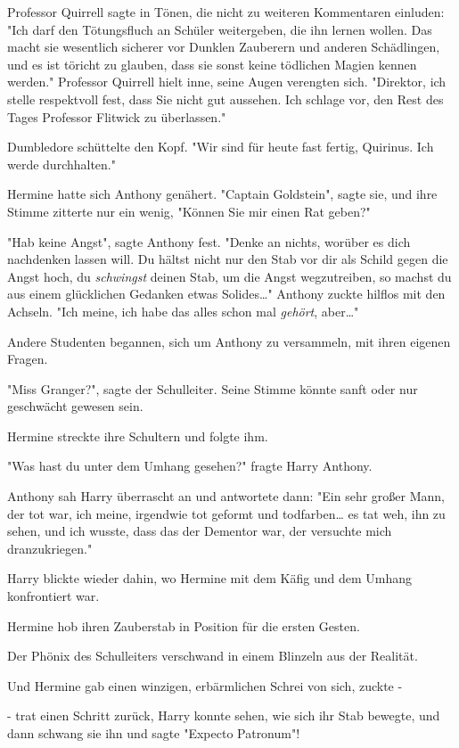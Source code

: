 {Professor Quirrell sagte in Tönen, die nicht zu weiteren Kommentaren einluden: "Ich darf den Tötungsfluch an Schüler weitergeben, die ihn lernen wollen. Das macht sie wesentlich sicherer vor Dunklen Zauberern und anderen Schädlingen, und es ist töricht zu glauben, dass sie sonst keine tödlichen Magien kennen werden." Professor Quirrell hielt inne, seine Augen verengten sich. "Direktor, ich stelle respektvoll fest, dass Sie nicht gut aussehen. Ich schlage vor, den Rest des Tages Professor Flitwick zu überlassen."

Dumbledore schüttelte den Kopf. "Wir sind für heute fast fertig, Quirinus. Ich werde durchhalten."

Hermine hatte sich Anthony genähert. "Captain Goldstein", sagte sie, und ihre Stimme zitterte nur ein wenig, "Können Sie mir einen Rat geben?"

"Hab keine Angst", sagte Anthony fest. "Denke an nichts, worüber es dich nachdenken lassen will. Du hältst nicht nur den Stab vor dir als Schild gegen die Angst hoch, du \emph{schwingst} deinen Stab, um die Angst wegzutreiben, so machst du aus einem glücklichen Gedanken etwas Solides…" Anthony zuckte hilflos mit den Achseln. "Ich meine, ich habe das alles schon mal \emph{gehört}, aber…"

Andere Studenten begannen, sich um Anthony zu versammeln, mit ihren eigenen Fragen.

"Miss Granger?", sagte der Schulleiter. Seine Stimme könnte sanft oder nur geschwächt gewesen sein.

Hermine streckte ihre Schultern und folgte ihm.

"Was hast du unter dem Umhang gesehen?" fragte Harry Anthony.

Anthony sah Harry überrascht an und antwortete dann: "Ein sehr großer Mann, der tot war, ich meine, irgendwie tot geformt und todfarben… es tat weh, ihn zu sehen, und ich wusste, dass das der Dementor war, der versuchte mich dranzukriegen."

Harry blickte wieder dahin, wo Hermine mit dem Käfig und dem Umhang konfrontiert war.

Hermine hob ihren Zauberstab in Position für die ersten Gesten.

Der Phönix des Schulleiters verschwand in einem Blinzeln aus der Realität.

Und Hermine gab einen winzigen, erbärmlichen Schrei von sich, zuckte -

- trat einen Schritt zurück, Harry konnte sehen, wie sich ihr Stab bewegte, und dann schwang sie ihn und sagte "Expecto Patronum"!

}
